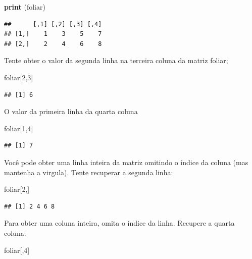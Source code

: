 \documentclass[]{book}
\newenvironment{Shaded}{\begin{snugshade}}{\end{snugshade}}
\newcommand{\DecValTok}[1]{\textcolor[rgb]{0.00,0.00,0.81}{#1}}
\newcommand{\KeywordTok}[1]{\textcolor[rgb]{0.13,0.29,0.53}{\textbf{#1}}}
\newcommand{\NormalTok}[1]{#1}
\begin{document}
\begin{Shaded}
\begin{Highlighting}[]
\KeywordTok{print}\NormalTok{ (foliar)}
\end{Highlighting}
\end{Shaded}

\begin{verbatim}
##      [,1] [,2] [,3] [,4]
## [1,]    1    3    5    7
## [2,]    2    4    6    8
\end{verbatim}

Tente obter o valor da segunda linha na terceira coluna da matriz foliar;

\begin{Shaded}
\begin{Highlighting}[]
\NormalTok{foliar[}\DecValTok{2}\NormalTok{,}\DecValTok{3}\NormalTok{]}
\end{Highlighting}
\end{Shaded}

\begin{verbatim}
## [1] 6
\end{verbatim}

O valor da primeira linha da quarta coluna

\begin{Shaded}
\begin{Highlighting}[]
\NormalTok{foliar[}\DecValTok{1}\NormalTok{,}\DecValTok{4}\NormalTok{]}
\end{Highlighting}
\end{Shaded}

\begin{verbatim}
## [1] 7
\end{verbatim}

Você pode obter uma linha inteira da matriz omitindo o índice da coluna (mas mantenha a virgula). Tente recuperar a segunda linha:

\begin{Shaded}
\begin{Highlighting}[]
\NormalTok{foliar[}\DecValTok{2}\NormalTok{,]}
\end{Highlighting}
\end{Shaded}

\begin{verbatim}
## [1] 2 4 6 8
\end{verbatim}

Para obter uma coluna inteira, omita o índice da linha. Recupere a quarta coluna:

\begin{Shaded}
\begin{Highlighting}[]
\NormalTok{foliar[,}\DecValTok{4}\NormalTok{]}
\end{Highlighting}
\end{Shaded}
\end{document}
